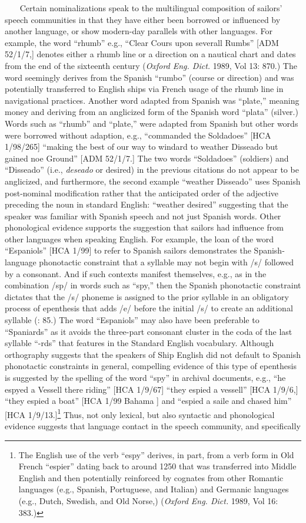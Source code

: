 ~~~   Certain nominalizations speak to the multilingual composition of sailors’ speech communities in that they have either been borrowed or influenced by another language, or show modern-day parallels with other languages. For example, the word “rhumb” e.g., “Clear Cours upon severall Rumbs” [ADM 52/1/7,] denotes either a rhumb line or a direction on a nautical chart and dates from the end of the sixteenth century (\textit{Oxford Eng. Dict.} 1989, Vol 13: 870.) The word seemingly derives from the Spanish “rumbo” (course or direction) and was potentially transferred to English ships via French usage of the rhumb line in navigational practices. Another word adapted from Spanish was “plate,” meaning money and deriving from an anglicized form of the Spanish word “plata” (silver.) Words such as “rhumb” and “plate,” were adapted from Spanish but other words were borrowed without adaption, e.g., “commanded the Soldadoes” [HCA 1/98/265] “making the best of our way to windard to weather Disseado but gained noe Ground” [ADM 52/1/7.] The two words “Soldadoes” (soldiers) and “Disseado” (i.e., \textit{deseado} or desired) in the previous citations do not appear to be anglicized, and furthermore, the second example “weather Disseado” uses Spanish post-nominal modification rather that the anticipated order of the adjective preceding the noun in standard English: “weather desired” suggesting that the speaker was familiar with Spanish speech and not just Spanish words. Other phonological evidence supports the suggestion that sailors had influence from other languages when speaking English. For example, the loan of the word “Espaniols” [HCA 1/99] to refer to Spanish sailors demonstrates the Spanish-language phonotactic constraint that a syllable may not begin with /s/ followed by a consonant. And if such contexts manifest themselves, e.g., as in the combination /sp/ in words such as “spy,” then the Spanish phonotactic constraint dictates that the /s/ phoneme is assigned to the prior syllable in an obligatory process of epenthesis that adds /e/ before the initial /s/ to create an additional syllable (\citealt{Schnitzer1997}: 85.) The word “Espaniols” may also have been preferable to “Spaniards” as it avoids the three-part consonant cluster in the coda of the last syllable “-rds” that features in the Standard English vocabulary. Although orthography suggests that the speakers of Ship English did not default to Spanish phonotactic constraints in general, compelling evidence of this type of epenthesis is suggested by the spelling of the word “spy” in archival documents, e.g., “he espyed a Vessell there riding” [HCA 1/9/67] “they espied a vessell” [HCA 1/9/6,] “they espied a boat” [HCA 1/99 Bahama \citealt{Islands1722}] and “espied a saile and chased him” [HCA 1/9/13.]\footnote{The English use of the verb “espy” derives, in part, from a verb form in Old French “espier” dating back to around 1250 that was transferred into Middle English and then potentially reinforced by cognates from other Romantic languages (e.g., Spanish, Portuguese, and Italian) and Germanic languages (e.g., Dutch, Swedish, and Old Norse,) (\textit{Oxford Eng. Dict.} 1989, Vol 16: 383.)} Thus, not only lexical, but also syntactic and phonological evidence suggests that language contact in the speech community, and specifically 